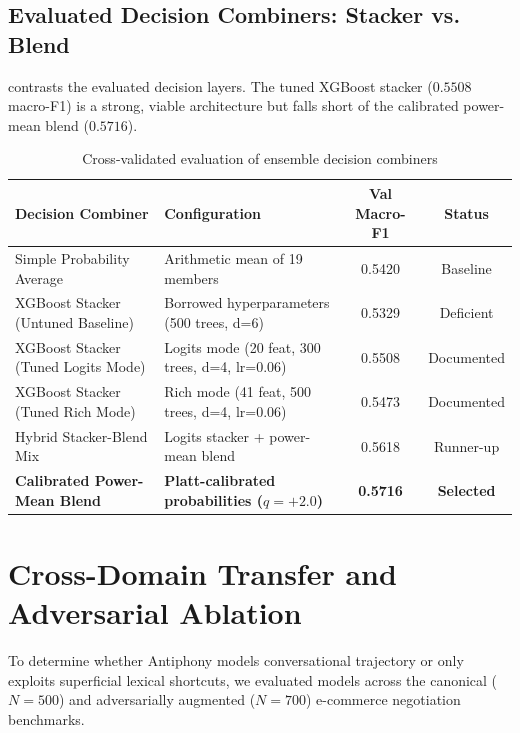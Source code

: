 \subsection{Evaluated Decision Combiners: Stacker vs. Blend}
 contrasts the evaluated decision layers. The tuned XGBoost stacker ($0.5508$ macro-F1) is a strong, viable architecture but falls short of the calibrated power-mean blend ($0.5716$).

\begin{table}[htbp]
  \centering
  \small
  \caption{Cross-validated evaluation of ensemble decision combiners}
  \label{tab:combiners}
  \begin{tabularx}{\textwidth}{llcc}
    \toprule
    \textbf{Decision Combiner} & \textbf{Configuration} & \textbf{Val Macro-F1} & \textbf{Status} \\
    \midrule
    Simple Probability Average & Arithmetic mean of 19 members & 0.5420 & Baseline \\
    \rowcolor{lightbg}
    XGBoost Stacker (Untuned Baseline) & Borrowed hyperparameters (500 trees, d=6) & 0.5329 & Deficient \\
    XGBoost Stacker (Tuned Logits Mode) & Logits mode (20 feat, 300 trees, d=4, lr=0.06) & 0.5508 & Documented \\
    \rowcolor{lightbg}
    XGBoost Stacker (Tuned Rich Mode) & Rich mode (41 feat, 500 trees, d=4, lr=0.06) & 0.5473 & Documented \\
    Hybrid Stacker-Blend Mix & Logits stacker + power-mean blend & 0.5618 & Runner-up \\
    \rowcolor{lightbg}
    \textbf{Calibrated Power-Mean Blend} & \textbf{Platt-calibrated probabilities ($q=+2.0$)} & \textbf{0.5716} & \textbf{Selected} \\
    \bottomrule
  \end{tabularx}
\end{table}

\section{Cross-Domain Transfer and Adversarial Ablation}
\label{sec:transfer-ablation}

To determine whether Antiphony models conversational trajectory or only exploits superficial lexical shortcuts, we evaluated models across the canonical ($N=500$) and adversarially augmented ($N=700$) e-commerce negotiation benchmarks.


